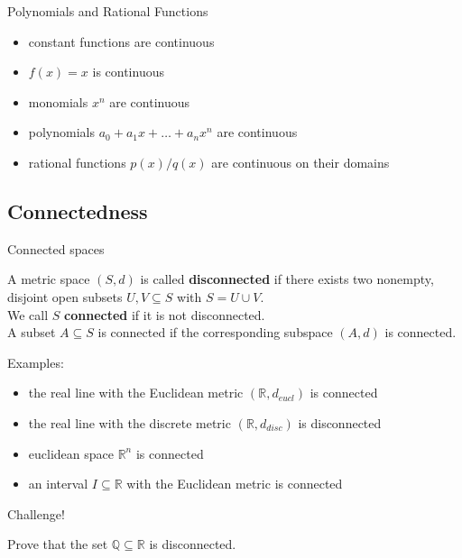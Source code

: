 \documentclass{beamer}
\begin{document}
\begin{frame}{Polynomials and Rational Functions}
\begin{itemize}
\item constant functions are continuous
\item $f(x) = x$ is continuous
\item monomials $x^n$ are continuous
\item polynomials $a_0 + a_1x + \dots + a_nx^n$ are continuous
\item rational functions $p(x)/q(x)$ are continuous on their domains
\end{itemize}
\end{frame}

\subsection{Connectedness}

\begin{frame}{Connected spaces}
\begin{defn}
A metric space $(S,d)$ is called \textbf{disconnected} if there exists two nonempty, disjoint open subsets $U,V\subseteq S$ with $S=U\cup V$.\\
\pause
We call $S$ \textbf{connected} if it is not disconnected.\\
\pause
A subset $A\subseteq S$ is connected if the corresponding subspace $(A,d)$ is connected.
\end{defn}
\pause
Examples:
\begin{itemize}
\pause
\item the real line with the Euclidean metric $(\mathbb{R},d_{eucl})$ is connected
\pause
\item the real line with the discrete metric $(\mathbb{R},d_{disc})$ is disconnected
\pause
\item euclidean space $\mathbb{R}^n$ is connected
\pause
\item an interval $I\subseteq \mathbb{R}$ with the Euclidean metric is connected
\end{itemize}
\end{frame}

\begin{frame}{Challenge!}
\begin{prob}
Prove that the set $\mathbb Q\subseteq \mathbb{R}$ is disconnected.
\end{prob}
\end{frame}
\end{document}
